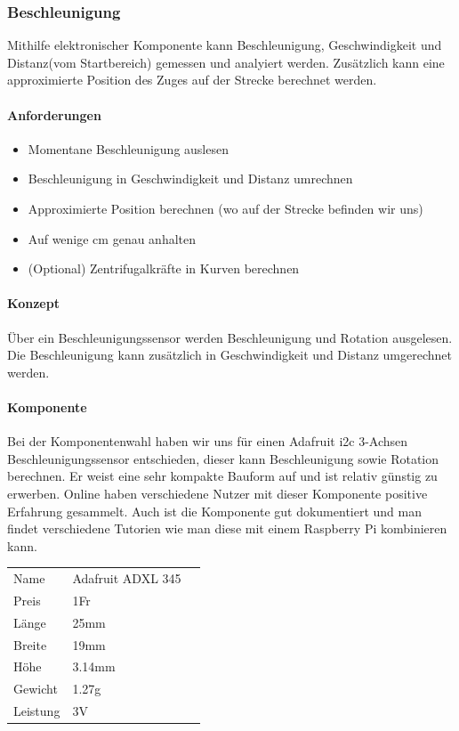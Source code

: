 \documentclass[../../main.tex]{subfiles}
\begin{document}
\subsubsection{Beschleunigung}
Mithilfe elektronischer Komponente kann Beschleunigung, Geschwindigkeit und Distanz(vom Startbereich) gemessen und analyiert werden. Zusätzlich kann eine approximierte Position des Zuges auf der Strecke berechnet werden.

\paragraph{Anforderungen}
\begin{itemize}
    \item Momentane Beschleunigung auslesen
    \item Beschleunigung in Geschwindigkeit und Distanz umrechnen
    \item Approximierte Position berechnen (wo auf der Strecke befinden wir uns)
    \item Auf wenige cm genau anhalten
    \item (Optional) Zentrifugalkräfte in Kurven berechnen
\end{itemize}

\paragraph{Konzept}
Über ein Beschleunigungssensor werden Beschleunigung und Rotation ausgelesen. Die Beschleunigung kann zusätzlich in Geschwindigkeit und Distanz umgerechnet werden.

\paragraph{Komponente}
Bei der Komponentenwahl haben wir uns für einen Adafruit i2c 3-Achsen Beschleunigungssensor entschieden, dieser kann Beschleunigung sowie Rotation berechnen. Er weist eine sehr kompakte Bauform auf und ist relativ günstig zu erwerben. Online haben verschiedene Nutzer mit dieser Komponente positive Erfahrung gesammelt. Auch ist die Komponente gut dokumentiert und man findet verschiedene Tutorien wie man diese mit einem Raspberry Pi kombinieren kann.

\begin{table}[] \centering
\begin{tabular}{lll}
Name & Adafruit ADXL 345 \\
Preis & 1Fr    \\
Länge & 25mm    \\
Breite & 19mm   \\
Höhe & 3.14mm   \\
Gewicht & 1.27g   \\
Leistung & 3V \\
\end{tabular}
\end{table}
\end{document}
